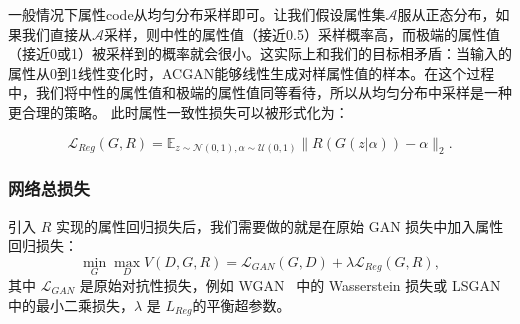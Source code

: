 

一般情况下属性code从均匀分布采样即可。让我们假设属性集$\mathcal{A}$服从正态分布，如果我们直接从$\mathcal{A}$采样，则中性的属性值（接近0.5）采样概率高，而极端的属性值（接近0或1）被采样到的概率就会很小。这实际上和我们的目标相矛盾：当输入的属性从0到1线性变化时，ACGAN能够线性生成对样属性值的样本。在这个过程中，我们将中性的属性值和极端的属性值同等看待，所以从均匀分布中采样是一种更合理的策略。
此时属性一致性损失可以被形式化为：

\begin{equation}
     \mathcal{L}_{Reg}(G, R)  =  \mathbb{E}_{z \sim \mathcal{N}(0,1), \alpha \sim \mathcal{U}(0,1)}\|R(G(z|\alpha)) - \alpha\|_2.
\end{equation}

\subsubsection{网络总损失}
引入 $R$ 实现的属性回归损失后，我们需要做的就是在原始 GAN 损失中加入属性回归损失：
\begin{equation}
     \min _{G} \max _{D} V(D, G, R) = \mathcal{L}_{GAN}(G, D) + \lambda \mathcal{L}_{Reg}(G, R),
     \label{overall}
\end{equation}
其中 $\mathcal{L}_{GAN}$ 是原始对抗性损失，例如 WGAN~\cite{wgan} 中的 Wasserstein 损失或 LSGAN~\cite{lsgan} 中的最小二乘损失，$\lambda$ 是 $L_{Reg}$的平衡超参数。


